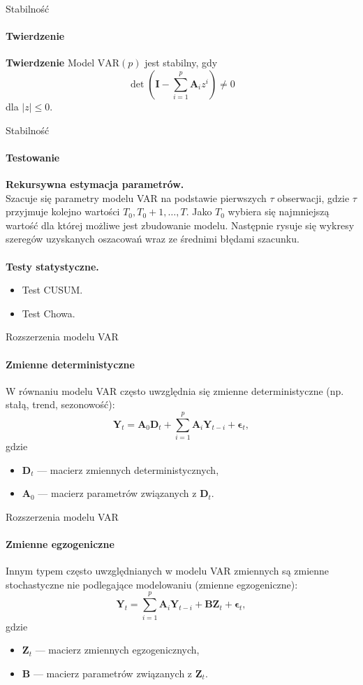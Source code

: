 \documentclass[a4paper, 11pt]{beamer}
\begin{document}
	\begin{frame}{Stabilność}
		\framesubtitle{Twierdzenie}
		\begin{block}{\textbf{Twierdzenie}}
			Model $\mbox{VAR}\left(p\right)$ jest stabilny, gdy \[
				\det\left(\boldsymbol{I} - \sum_{i=1}^{p}\boldsymbol{A}_i z^{i}\right) \neq 0
			\] dla $\left| z \right| \leq 0.$
		\end{block}
	\end{frame}
	
	\begin{frame}{Stabilność}
		\framesubtitle{Testowanie}
		\textbf{Rekursywna estymacja parametrów.}\\
			Szacuje się parametry modelu VAR na podstawie pierwszych $\tau$ obserwacji,
			gdzie $\tau$ przyjmuje kolejno wartości $T_0, T_0 + 1, \ldots, T.$ Jako $T_0$
			wybiera się najmniejszą wartość dla której możliwe jest zbudowanie modelu.
			Następnie rysuje się wykresy szeregów uzyskanych oszacowań wraz ze średnimi
			błędami szacunku.
		\\~\\
		\textbf{Testy statystyczne.}
		\begin{itemize}
			\item Test CUSUM.
			\item Test Chowa.
		\end{itemize}
	\end{frame}
	
	\begin{frame}{Rozszerzenia modelu VAR}
		\framesubtitle{Zmienne deterministyczne}
		W równaniu modelu VAR często uwzględnia się zmienne deterministyczne
		(np. stałą, trend, sezonowość): \[
			\boldsymbol{Y}_{t} =
				\boldsymbol{A}_0 \boldsymbol{D}_t +
				\sum_{i=1}^{p}
					\boldsymbol{A}_{i} \boldsymbol{Y}_{t-i} +
					\boldsymbol{\epsilon}_{t},
		\] gdzie
		\begin{itemize}
			\item $\boldsymbol{D}_t$ --- macierz zmiennych
			deterministycznych,
			\item $\boldsymbol{A}_0$ --- macierz parametrów
				związanych z $\boldsymbol{D}_t.$
		\end{itemize}
	\end{frame}
	
	\begin{frame}{Rozszerzenia modelu VAR}
		\framesubtitle{Zmienne egzogeniczne}
		Innym typem często uwzględnianych w modelu VAR zmiennych
		są zmienne stochastyczne nie podlegające modelowaniu
		(zmienne egzogeniczne): \[
			\boldsymbol{Y}_{t} =
				\sum_{i=1}^{p}
					\boldsymbol{A}_{i} \boldsymbol{Y}_{t-i} +
				\boldsymbol{B} \boldsymbol{Z}_t +
				\boldsymbol{\epsilon}_{t},
		\] gdzie
		\begin{itemize}
			\item $\boldsymbol{Z}_t$ --- macierz zmiennych
			egzogenicznych,
			\item $\boldsymbol{B}$ --- macierz parametrów
				związanych z $\boldsymbol{Z}_t.$
		\end{itemize}
	\end{frame}
	
\end{document}
